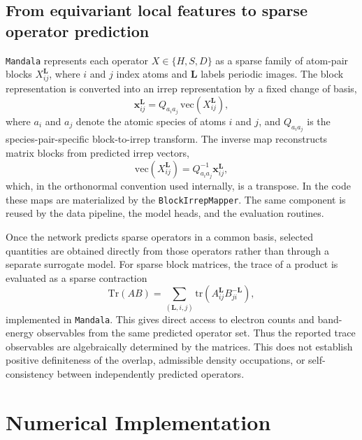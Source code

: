 \documentclass[preprint,12pt,compress,numafflabel]{elsarticle}
\newcommand{\Tr}{\mathrm{Tr}}
\begin{document}
\subsection{From equivariant local features to sparse operator prediction}
\label{subsec:matrix_observable_background}

\texttt{Mandala} represents each operator $X \in \{H,S,D\}$ as a sparse family of atom-pair blocks $X_{ij}^{\bm{L}}$, where $i$ and $j$ index atoms and $\bm{L}$ labels periodic images.
The block representation is converted into an irrep representation by a fixed change of basis,
\begin{equation}
\bm{x}_{ij}^{\bm{L}} = Q_{a_i a_j} \, \mathrm{vec}\!\left(X_{ij}^{\bm{L}}\right),
\end{equation}
where $a_i$ and $a_j$ denote the atomic species of atoms $i$ and $j$, and $Q_{a_i a_j}$ is the species-pair-specific block-to-irrep transform.
The inverse map reconstructs matrix blocks from predicted irrep vectors,
\begin{equation}
\mathrm{vec}\!\left(X_{ij}^{\bm{L}}\right)
=
Q_{a_i a_j}^{-1} \bm{x}_{ij}^{\bm{L}},
\end{equation}
which, in the orthonormal convention used internally, is a transpose.
In the code these maps are materialized by the \texttt{BlockIrrepMapper}. The same component is reused by the data pipeline, the model heads, and the evaluation routines.

Once the network predicts sparse operators in a common basis, selected quantities are obtained directly from those operators rather than through a separate surrogate model.
For sparse block matrices, the trace of a product is evaluated as a sparse contraction
\begin{equation}
\Tr(AB)
=
\sum_{(\bm{L},i,j)}
\mathrm{tr}\!\left(
A_{ij}^{\bm{L}} B_{ji}^{-\bm{L}}
\right),
\end{equation}
implemented in \texttt{Mandala}. This gives direct access to electron counts and band-energy observables from the same predicted operator set.
Thus the reported trace observables are algebraically determined by the matrices. This does not establish positive definiteness of the overlap, admissible density occupations, or self-consistency between independently predicted operators.


\section{Numerical Implementation}
\label{sec:implementation}
\end{document}
